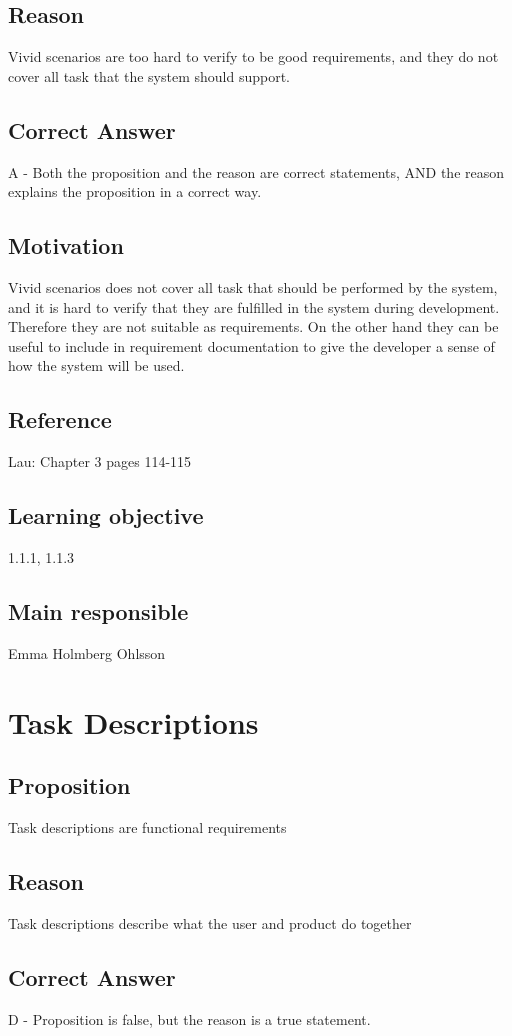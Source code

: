 \documentclass[a4paper]{article}
\begin{document}
\subsection{Reason}
Vivid scenarios are too hard to verify to be good requirements, and they do not cover all task that the system should support.
\subsection{Correct Answer}
A - Both the proposition and the reason are correct statements, AND the reason explains the proposition in a correct way.
\subsection{Motivation}
Vivid scenarios does not cover all task that should be performed by the system, and it is hard to verify that they are fulfilled in the system during development. Therefore they are not suitable as requirements. On the other hand they can be useful to include in requirement documentation to give the developer a sense of how the system will be used.
\subsection{Reference}
Lau: Chapter 3 pages 114-115
\subsection{Learning objective}
1.1.1, 1.1.3
\subsection{Main responsible}
Emma Holmberg Ohlsson


\section{Task Descriptions}
\subsection{Proposition}
Task descriptions are functional requirements
\subsection{Reason}
Task descriptions describe what the user and product do together
\subsection{Correct Answer}
D - Proposition is false, but the reason is a true statement.
\end{document}
